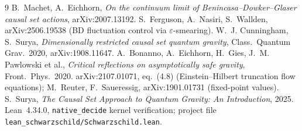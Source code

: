 \documentclass[11pt]{article}
\begin{document}
\begin{thebibliography}{9}
 B.~Machet, A.~Eichhorn,
  \textit{On the continuum limit of Benincasa--Dowker--Glaser causal set
  actions}, arXiv:2007.13192.
 S.~Ferguson, A.~Nasiri, S.~Wallden,
  arXiv:2506.19538 (BD fluctuation control via $\varepsilon$-smearing).
 W.~J. Cunningham, S.~Surya,
  \textit{Dimensionally restricted causal set quantum gravity},
  Class.\ Quantum Grav.\ 2020, arXiv:1908.11647.
 A.~Bonanno, A.~Eichhorn, H.~Gies, J.~M. Pawlowski et al.,
  \textit{Critical reflections on asymptotically safe gravity},
  Front.\ Phys.\ 2020.
 arXiv:2107.01071, eq.~(4.8) (Einstein--Hilbert truncation flow
  equations); M.~Reuter, F.~Saueressig, arXiv:1901.01731 (fixed-point values).
 S.~Surya, \textit{The Causal Set Approach to Quantum Gravity:
  An Introduction}, 2025.
 Lean~4.34.0, \texttt{native\_decide} kernel verification;
  project file \texttt{lean\_schwarzschild/Schwarzschild.lean}.
\end{thebibliography}
\end{document}
